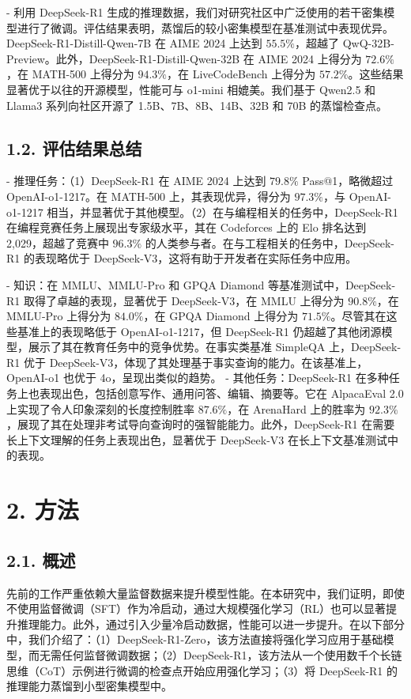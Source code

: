 \documentclass[12pt,a4paper]{report} %
\begin{document}
- 利用 DeepSeek-R1 生成的推理数据，我们对研究社区中广泛使用的若干密集模型进行了微调。评估结果表明，蒸馏后的较小密集模型在基准测试中表现优异。DeepSeek-R1-Distill-Qwen-7B 在 AIME 2024 上达到 $55.5 \%$，超越了 QwQ-32B-Preview。此外，DeepSeek-R1-Distill-Qwen-32B 在 AIME 2024 上得分为 $72.6 \%$，在 MATH-500 上得分为 $94.3 \%$，在 LiveCodeBench 上得分为 $57.2 \%$。这些结果显著优于以往的开源模型，性能可与 o1-mini 相媲美。我们基于 Qwen2.5 和 Llama3 系列向社区开源了 1.5B、7B、8B、14B、32B 和 70B 的蒸馏检查点。


\subsection*{1.2. 评估结果总结}


- 推理任务：（1）DeepSeek-R1 在 AIME 2024 上达到 $79.8 \%$ Pass@1，略微超过 OpenAI-o1-1217。在 MATH-500 上，其表现优异，得分为 $97.3 \%$，与 OpenAI-o1-1217 相当，并显著优于其他模型。（2）在与编程相关的任务中，DeepSeek-R1 在编程竞赛任务上展现出专家级水平，其在 Codeforces 上的 Elo 排名达到 2,029，超越了竞赛中 $96.3 \%$ 的人类参与者。在与工程相关的任务中，DeepSeek-R1 的表现略优于 DeepSeek-V3，这将有助于开发者在实际任务中应用。


- 知识：在 MMLU、MMLU-Pro 和 GPQA Diamond 等基准测试中，DeepSeek-R1 取得了卓越的表现，显著优于 DeepSeek-V3，在 MMLU 上得分为 $90.8 \%$，在 MMLU-Pro 上得分为 $84.0 \%$，在 GPQA Diamond 上得分为 $71.5 \%$。尽管其在这些基准上的表现略低于 OpenAI-o1-1217，但 DeepSeek-R1 仍超越了其他闭源模型，展示了其在教育任务中的竞争优势。在事实类基准 SimpleQA 上，DeepSeek-R1 优于 DeepSeek-V3，体现了其处理基于事实查询的能力。在该基准上，OpenAI-o1 也优于 4o，呈现出类似的趋势。
- 其他任务：DeepSeek-R1 在多种任务上也表现出色，包括创意写作、通用问答、编辑、摘要等。它在 AlpacaEval 2.0 上实现了令人印象深刻的长度控制胜率 $87.6 \%$，在 ArenaHard 上的胜率为 $92.3 \%$，展现了其在处理非考试导向查询时的强智能能力。此外，DeepSeek-R1 在需要长上下文理解的任务上表现出色，显著优于 DeepSeek-V3 在长上下文基准测试中的表现。


\section*{2. 方法}


\subsection*{2.1. 概述}


先前的工作严重依赖大量监督数据来提升模型性能。在本研究中，我们证明，即使不使用监督微调（SFT）作为冷启动，通过大规模强化学习（RL）也可以显著提升推理能力。此外，通过引入少量冷启动数据，性能可以进一步提升。在以下部分中，我们介绍了：（1）DeepSeek-R1-Zero，该方法直接将强化学习应用于基础模型，而无需任何监督微调数据；（2）DeepSeek-R1，该方法从一个使用数千个长链思维（CoT）示例进行微调的检查点开始应用强化学习；（3）将 DeepSeek-R1 的推理能力蒸馏到小型密集模型中。
\end{document}

